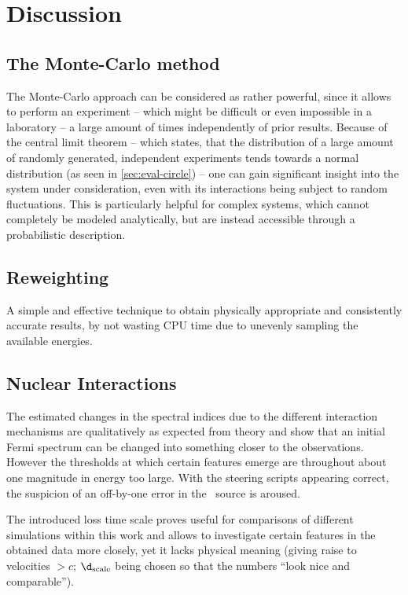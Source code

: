 \section{Discussion}
\subsection{The Monte-Carlo method}
The Monte-Carlo approach can be considered as rather powerful, since it allows
to perform  an experiment -- which might be difficult or even impossible in a
laboratory -- a large amount of times independently of prior results. Because of
the central limit theorem -- which states, that the distribution of a
large amount of randomly generated, independent experiments tends
towards a normal distribution (as seen in \cref{sec:eval-circle}) -- one
can gain significant insight into the system under consideration,
even with its interactions being subject to random fluctuations.
This is particularly helpful for complex systems, which cannot completely be
modeled analytically, but are instead accessible through a probabilistic
description.

\subsection{Reweighting}
\label{sec:dis-rew}
A simple and effective technique to obtain physically appropriate and
consistently accurate results, by not wasting CPU time due to unevenly sampling
the available energies.

\subsection{Nuclear Interactions}
The estimated changes in the spectral indices due to the different interaction
mechanisms are qualitatively as expected from theory and show that an initial
Fermi spectrum can be changed into something closer to the observations.
However the thresholds at which certain features emerge are throughout about
one magnitude in energy too large.  With the steering scripts appearing
correct, the suspicion of an off-by-one error in the \CRPropa~source is
aroused.

The introduced loss time scale proves useful for comparisons of different
simulations within this work and allows to investigate certain features in the
obtained data more closely, yet it lacks physical meaning (giving raise to
velocities $>c$; $\d_{\mathrm{scale}}$ being chosen so that the numbers
\enquote{look nice and comparable}).

